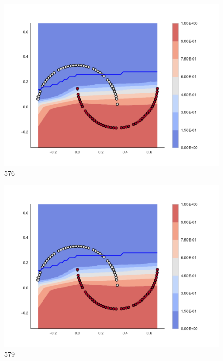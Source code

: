 \begin{subfigure}[b]{0.09\textwidth}
    \includegraphics[clip, trim=2.35cm 1.75cm 4.5cm 0cm,width=\textwidth]{img/convergence/576.pdf}
    \caption{576}
    \label{fig:convergence_576}
\end{subfigure}
%
\begin{subfigure}[b]{0.09\textwidth}
    \includegraphics[clip, trim=2.35cm 1.75cm 4.5cm 0cm,width=\textwidth]{img/convergence/579.pdf}
    \caption{579}
    \label{fig:convergence_579}
\end{subfigure}
%
